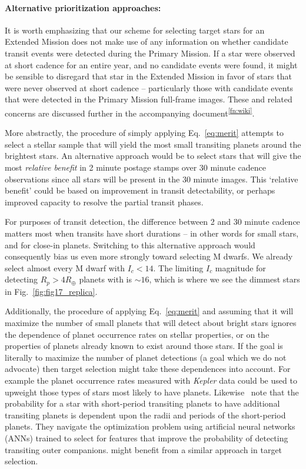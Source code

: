 \paragraph{Alternative prioritization approaches:}

It is worth emphasizing that our scheme for selecting target stars for
an Extended Mission does not make use of any information on whether
candidate transit events were detected during the Primary Mission.  If
a star were observed at short cadence for an entire year, and no
candidate events were found, it might be sensible to disregard that
star in the Extended Mission in favor of stars that were never
observed at short cadence -- particularly those with candidate events
that were detected in the Primary Mission full-frame images.  These
and related concerns are discussed further in the accompanying
document\textsuperscript{\ref{fn:wiki}}.

More abstractly, the procedure of simply applying Eq.~\ref{eq:merit}
attempts to select a stellar sample that will yield the most small
transiting planets around the brightest stars.  An alternative
approach would be to select stars that will give the most 
\textit{relative benefit} in 2 minute postage stamps over 30 
minute cadence observations since all stars will be present in the
30 minute images.  This `relative benefit' could be based on
improvement in transit detectability, or perhaps improved 
capacity to resolve the partial transit phases.

For purposes of transit detection, the difference between 2 and 30
minute cadence matters most when transits have short durations -- in
other words for small stars, and for close-in planets.  Switching to
this alternative approach would consequently bias us even more
strongly toward selecting M dwarfs.  We already select almost every M
dwarf with $I_c < 14$.  The limiting $I_c$ magnitude for detecting
$R_p > 4R_\oplus$ planets with \tess is $\sim\!16$, which is where we
see the dimmest stars in Fig.~\ref{fig:fig17_replica}.

Additionally, the procedure of applying Eq.~\ref{eq:merit} and
assuming that it will maximize the number of small planets that \tess
will detect about bright stars ignores the dependence of
planet occurrence rates on stellar properties, or on the properties of
 planets already known to exist around those stars. If the goal is literally to maximize the number of planet
detections (a goal which we do not advocate) then \tesss target selection might take these dependences into
account. For example the planet occurrence rates measured with {\it Kepler} data could be used
to upweight those types of stars most likely to have planets.
Likewise~\protect\citet{kipping_transit_2016} note that the
probability for a star with short-period transiting planets to have additional transiting
planets is dependent upon the radii and periods of the
short-period planets.  They navigate the optimization problem using artificial neural
networks (ANNs) trained to select for features that improve the
probability of detecting transiting outer companions.  \tess might
benefit from a similar approach in target selection.

